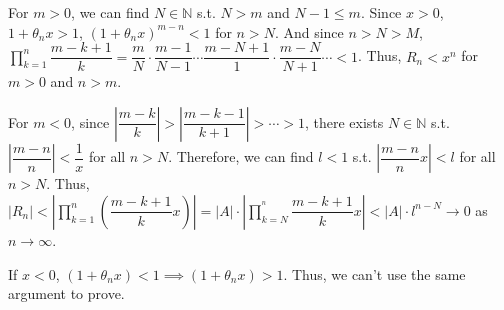 \documentclass[12pt]{article}
\begin{document}
\begin{enumerate}
    For $m > 0$, we can find $N\in \mathbb{N}$ s.t. $N > m$ and $N-1 \leq m$.
    Since $x > 0$, $1 + \theta_n x > 1$, $(1+\theta_n x)^{m-n} < 1$ for $n > N$.
    And since $n > N > M$, $\displaystyle\prod_{k=1}^{n}\dfrac{m-k+1}{k} = \dfrac{m}{N} \cdot \dfrac{m-1}{N-1} \cdots \dfrac{m-N+1}{1} \cdot \dfrac{m-N}{N+1}\cdots < 1$.
    Thus, $R_n < x^n$ for $m > 0$ and $n > m$.
    
    For $m < 0$, since $|\dfrac{m-k}{k}| > |\dfrac{m-k-1}{k+1}| > \cdots > 1$,
    there exists $N\in \mathbb{N}$ s.t. $|\dfrac{m-n}{n}| < \dfrac{1}{x}$ for all $n > N$.
    Therefore, we can find $l < 1$ s.t. $|\dfrac{m-n}{n}x| < l$ for all $n > N$.
    Thus, $|R_n| < |\displaystyle\prod_{k=1}^{n} (\dfrac{m-k+1}{k}x)| = |A|\cdot |\displaystyle\prod_{k=N}^{^n} \dfrac{m-k+1}{k}x| < |A|\cdot l^{n-N} \to 0$ as $n\to\infty$.

    If $x < 0$, $(1 + \theta_n x) < 1\implies (1 +\theta_n x) > 1$.
    Thus, we can't use the same argument to prove.
\end{enumerate}
\end{document}
